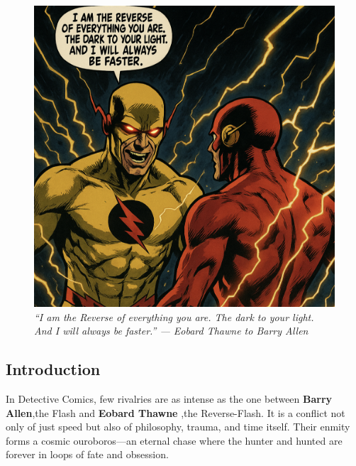 \usepackage{framed}
\newenvironment{magquote}
  {\begin{shaded*}\itshape\small}
  {\end{shaded*}}


\begin{figure}[h!]
  \centering
  \includegraphics[width=0.9\linewidth]{reverse_.png}
  \caption*{\textit{“I am the Reverse of everything you are. The dark to your light. And I will always be faster.” — Eobard Thawne to Barry Allen}}
\end{figure}

\subsection*{Introduction}
In Detective Comics, few rivalries are as intense as the one between \textbf{Barry Allen},the Flash and \textbf{Eobard Thawne },the Reverse-Flash. It is a conflict not only of just speed but also of philosophy, trauma, and time itself. Their enmity forms a cosmic ouroboros—an eternal chase where the hunter and hunted are forever in loops of fate and obsession.

